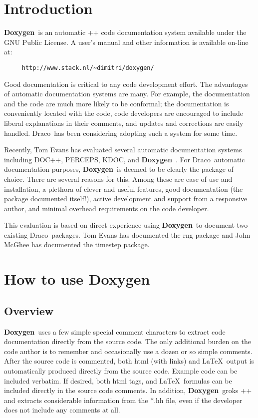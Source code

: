 \documentclass[11pt]{nmemo}
\newcommand{\draco}{{\normalfont\sffamily Draco}}
\newcommand{\doxy}{{\normalfont\bfseries Doxygen}}
\begin{document}

\section{Introduction}

\doxy\ is an automatic \C++ code documentation system available under
the GNU Public License.  A user's manual and other information is
available on-line at:
\begin{verbatim} 
     http://www.stack.nl/~dimitri/doxygen/ 
\end{verbatim}

Good documentation is critical to any code development effort.  The
advantages of automatic documentation systems are many.  For example,
the documentation and the code are much more likely to be conformal;
the documentation is conveniently located with the code, code
developers are encouraged to include liberal explanations in their
comments, and updates and corrections are easily handled.  \draco\ has
been considering adopting such a system for some time.


Recently, Tom Evans has evaluated several automatic documentation
systems including DOC++, PERCEPS, KDOC, and \doxy\ .  For \draco\ 
automatic documentation purposes, \doxy\ is deemed to be clearly the
package of choice. There are several reasons for this. Among these are
ease of use and installation, a plethora of clever and useful
features, good documentation (the package documented itself!), active
development and support from a responsive author, and minimal overhead
requirements on the code developer.


This evaluation is based on direct experience using \doxy\ to document
two existing \draco\ packages.  Tom Evans has documented the rng package and
John McGhee has documented the timestep package.  


\section{How to use \doxy\ }

\subsection{Overview}

\doxy\ uses a few simple special comment characters to extract code
documentation directly from the source code. The only additional burden
on the code author is to remember and occasionally use a dozen or so
simple comments. After the source code is commented, both html (with links)
and \LaTeX\ output is automatically produced directly from the source code.
Example code can be included verbatim. If desired, both  html tags, and \LaTeX\
formulas can be included directly in the source code comments. In addition,
\doxy\ groks \C++ and extracts considerable information from the *.hh
file, even if the developer does not include any comments at all.
\end{document}
